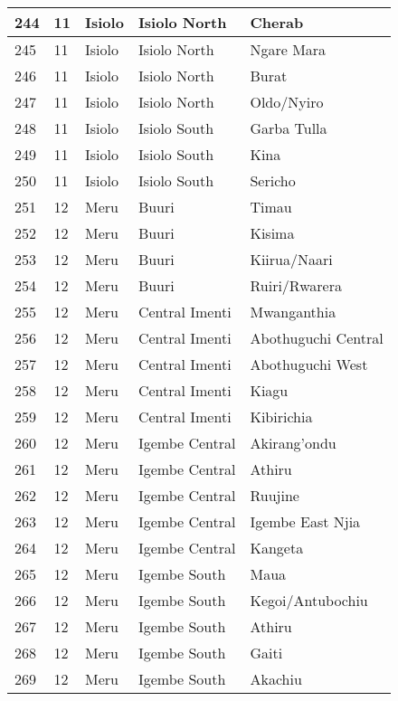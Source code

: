 \begin{table}[!ht]
\begin{tabular}{|l|l|l|l|l|}
        244 & 11 & Isiolo & Isiolo North & Cherab \\ \hline
        245 & 11 & Isiolo & Isiolo North & Ngare Mara \\ \hline
        246 & 11 & Isiolo & Isiolo North & Burat \\ \hline
        247 & 11 & Isiolo & Isiolo North & Oldo/Nyiro \\ \hline
        248 & 11 & Isiolo & Isiolo South & Garba Tulla \\ \hline
        249 & 11 & Isiolo & Isiolo South & Kina \\ \hline
        250 & 11 & Isiolo & Isiolo South & Sericho \\ \hline
        251 & 12 & Meru & Buuri & Timau \\ \hline
        252 & 12 & Meru & Buuri & Kisima \\ \hline
        253 & 12 & Meru & Buuri & Kiirua/Naari \\ \hline
        254 & 12 & Meru & Buuri & Ruiri/Rwarera \\ \hline
        255 & 12 & Meru & Central Imenti & Mwanganthia \\ \hline
        256 & 12 & Meru & Central Imenti & Abothuguchi Central \\ \hline
        257 & 12 & Meru & Central Imenti & Abothuguchi West \\ \hline
        258 & 12 & Meru & Central Imenti & Kiagu \\ \hline
        259 & 12 & Meru & Central Imenti & Kibirichia \\ \hline
        260 & 12 & Meru & Igembe Central & Akirang’ondu \\ \hline
        261 & 12 & Meru & Igembe Central & Athiru \\ \hline
        262 & 12 & Meru & Igembe Central & Ruujine \\ \hline
        263 & 12 & Meru & Igembe Central & Igembe East Njia \\ \hline
        264 & 12 & Meru & Igembe Central & Kangeta \\ \hline
        265 & 12 & Meru & Igembe South & Maua \\ \hline
        266 & 12 & Meru & Igembe South & Kegoi/Antubochiu \\ \hline
        267 & 12 & Meru & Igembe South & Athiru \\ \hline
        268 & 12 & Meru & Igembe South & Gaiti \\ \hline
        269 & 12 & Meru & Igembe South & Akachiu \\ \hline

\end{tabular}
\end{table}
